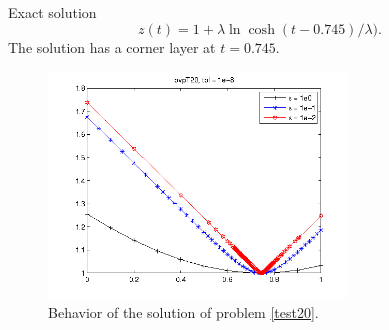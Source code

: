 \documentclass[<options>]{article}
\begin{document}
\textrm{Exact solution}
$$z(t) = 1 +\lambda \ln \cosh(t - 0.745) /\lambda).$$
The solution has a corner layer at $t = 0.745.$

\begin{figure}[htb]
\centerline{\includegraphics[height=6cm]{Prob20}}
\caption{Behavior of the solution of problem \ref{test20}.}
\end{figure}
\newpage
\end{document}
